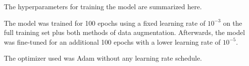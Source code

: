 
The hyperparameters for training the model are summarized
here.


The model was trained for 100 epochs using a fixed learning
rate of $10^{-3}$ on the full training set plus both methods
of data augmentation. Afterwards, the model was fine-tuned
for an additional 100 epochs with a lower learning rate of
$10^{-5}$.


The optimizer used was Adam without any learning rate
schedule.
